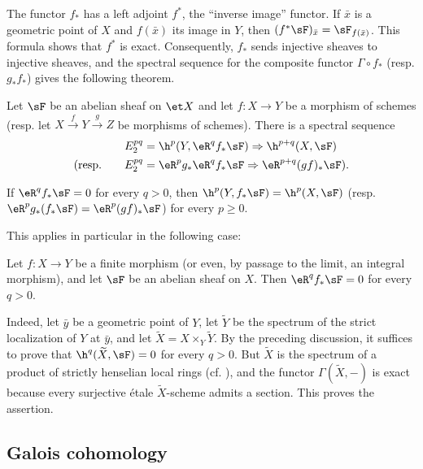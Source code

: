 \documentclass[oneside]{book}
\begin{document}
The functor $f_*$ has a left adjoint $f^*$, the “inverse image” functor.
If $\bar x$ is a geometric point of $X$ and $f(\bar x)$ its image in
$Y$, then $(f^*\sF)_{\bar x}=\sF_{f(\bar x)}$. This formula shows that
$f^*$ is exact. Consequently, $f_*$ sends injective sheaves to injective
sheaves, and the spectral sequence for the composite functor
$\Gamma\circ f_*$ (resp. $g_*f_*$) gives the following theorem.

\begin{theorem}\label{I:2-3-4}
Let $\sF$ be an abelian sheaf on $\et X$ and let $f:X\to Y$ be a
morphism of schemes (resp. let
$X\xrightarrow fY\xrightarrow gZ$ be morphisms of schemes). There is a
spectral sequence
\begin{align*}
  E_2^{pq} &= \h^p(Y,\eR^q f_* \sF) \Rightarrow \h^{p+q}(X,\sF) \\
  \text{(resp.}\qquad E_2^{pq} &= \eR^p g_* \eR^q f_* \sF \Rightarrow \eR^{p+q}(gf)_* \sF\text{).}
\end{align*}
\end{theorem}

\begin{corollary}\label{I:2-3-5}
If $\eR^qf_*\sF=0$ for every $q>0$, then
$\h^p(Y,f_*\sF)=\h^p(X,\sF)$ (resp.
$\eR^pg_*(f_*\sF)=\eR^p(gf)_*\sF$) for every $p\geqslant0$.
\end{corollary}

This applies in particular in the following case:

\begin{proposition}\label{I:2-3-6}
Let $f:X\to Y$ be a finite morphism (or even, by passage to the limit,
an integral morphism), and let $\sF$ be an abelian sheaf on $X$. Then
$\eR^qf_*\sF=0$ for every $q>0$.
\end{proposition}

Indeed, let $\bar y$ be a geometric point of $Y$, let $\widetilde Y$ be
the spectrum of the strict localization of $Y$ at $\bar y$, and let
$\widetilde X=X\times_Y\widetilde Y$. By the preceding discussion, it
suffices to prove that $\h^q(\widetilde X,\sF)=0$ for every $q>0$. But
$\widetilde X$ is the spectrum of a product of strictly henselian local
rings (cf. \cite[I]{ra70}), and the functor
$\Gamma(\widetilde X,-)$ is exact because every surjective étale
$\widetilde X$-scheme admits a section. This proves the assertion.

\subsection{Galois cohomology}\label{I:2-4}
\end{document}
